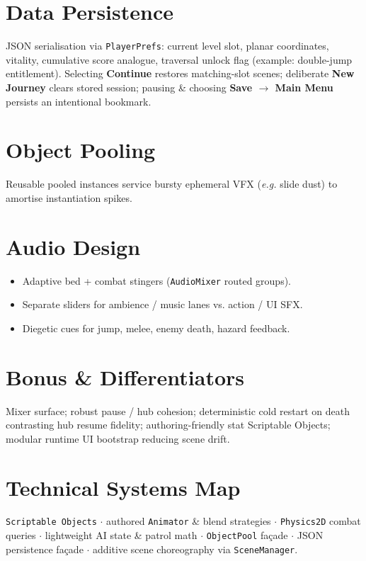 \documentclass[11pt,a4paper]{article}
\begin{document}
\section{Data Persistence}
JSON serialisation via \texttt{PlayerPrefs}: current level slot, planar coordinates, vitality, cumulative score analogue, traversal unlock flag (example: double-jump entitlement). Selecting \textbf{Continue} restores matching-slot scenes; deliberate \textbf{New Journey} clears stored session; pausing \& choosing \textbf{Save $\rightarrow$ Main Menu} persists an intentional bookmark.

\section{Object Pooling}
Reusable pooled instances service bursty ephemeral VFX (\emph{e.g.} slide dust) to amortise instantiation spikes.

\section{Audio Design}

\begin{itemize}[leftmargin=*]
    \item Adaptive bed + combat stingers (\texttt{AudioMixer} routed groups).
    \item Separate sliders for ambience / music lanes vs. action / UI SFX.
    \item Diegetic cues for jump, melee, enemy death, hazard feedback.
\end{itemize}

\section{Bonus \& Differentiators}
Mixer surface; robust pause / hub cohesion; deterministic cold restart on death contrasting hub resume fidelity; authoring-friendly stat Scriptable Objects; modular runtime UI bootstrap reducing scene drift.

\section{Technical Systems Map}
\texttt{Scriptable Objects} $\cdot$ authored \texttt{Animator} \& blend strategies $\cdot$ \texttt{Physics2D} combat queries $\cdot$ lightweight AI state \& patrol math $\cdot$ \texttt{ObjectPool} façade $\cdot$ JSON persistence façade $\cdot$ additive scene choreography via \texttt{SceneManager}.
\end{document}
